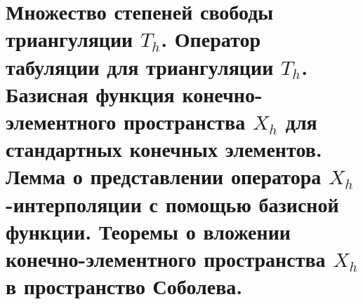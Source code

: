 \documentclass[__main__.tex]{subfiles}
\begin{document}
\section{Множество степеней свободы триангуляции $T_h$. Оператор табуляции для триангуляции $T_h$. Базисная функция конечно-элементного пространства $X_h$ для стандартных конечных элементов. Лемма о представлении оператора $X_h$ -интерполяции с помощью базисной функции. Теоремы о вложении конечно-элементного пространства $X_h$ в пространство Соболева.}
\end{document}
